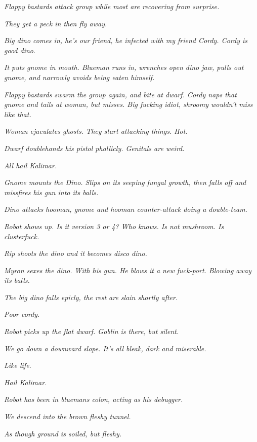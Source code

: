 \textit{Flappy bastards attack group while most are recovering from surprise.}\medskip

\textit{They get a peck in then fly away.}\medskip

\textit{Big dino comes in, he’s our friend, he infected with my friend Cordy. Cordy is good dino.}\medskip

\textit{It puts gnome in mouth. Blueman runs in, wrenches open dino jaw, pulls out gnome, and narrowly avoids being eaten himself.}\medskip

\textit{Flappy bastards swarm the group again, and bite at dwarf. Cordy naps that gnome and tails at woman, but misses. Big fucking idiot, shroomy wouldn’t miss like that.}\medskip

\textit{Woman ejaculates ghosts. They start attacking things. Hot.}\medskip

\textit{Dwarf doublehands his pistol phallicly. Genitals are weird.}\medskip

\textit{All hail Kalimar.}\medskip

\textit{Gnome mounts the Dino. Slips on its seeping fungal growth, then falls off and missfires his gun into its balls.}\medskip

\textit{Dino attacks hooman, gnome and hooman counter-attack doing a double-team.}\medskip

\textit{Robot shows up. Is it version 3 or 4? Who knows. Is not mushroom. Is clusterfuck.}\medskip

\textit{Rip shoots the dino and it becomes disco dino.}\medskip

\textit{Myron sexes the dino. With his gun. He blows it a new fuck-port. Blowing away its balls.}\medskip

\textit{The big dino falls epicly, the rest are slain shortly after.}\medskip

\textit{Poor cordy.}\medskip

\textit{Robot picks up the flat dwarf. Goblin is there, but silent.}\medskip

\textit{We go down a downward slope. It’s all bleak, dark and miserable.}\medskip

\textit{Like life.}\medskip

\textit{Hail Kalimar.}\medskip

\textit{Robot has been in bluemans colon, acting as his debugger.}\medskip

\textit{We descend into the brown fleshy tunnel.}\medskip

\textit{As though ground is soiled, but fleshy.}\medskip

